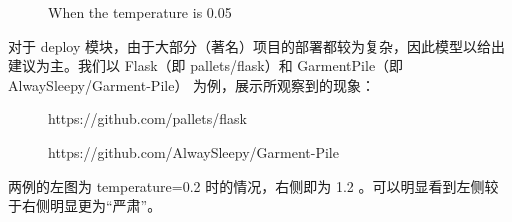 \documentclass{article}
\theoremstyle{plain}
\theoremstyle{definition}
\theoremstyle{remark}
\begin{document}
\begin{figure}[H]
\centering
{}
\caption{When the temperature is 0.05}
\label{Fig.main}
\end{figure}

对于 deploy 模块，由于大部分（著名）项目的部署都较为复杂，因此模型以给出建议为主。我们以 Flask（即 pallets/flask）和 GarmentPile（即 AlwaySleepy/Garment-Pile） 为例，展示所观察到的现象：

\begin{figure}[H]
\centering
{}
\caption{https://github.com/pallets/flask}
\label{Fig.main}
\end{figure}

\begin{figure}[H]
\centering
{}
\caption{https://github.com/AlwaySleepy/Garment-Pile}
\label{Fig.main}
\end{figure}

两例的左图为 temperature=0.2 时的情况，右侧即为 1.2 。可以明显看到左侧较于右侧明显更为“严肃”。
\end{document}
